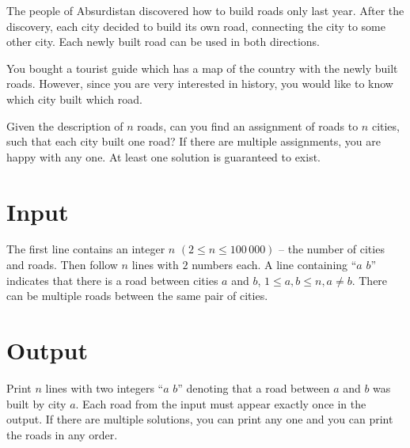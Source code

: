 

\noindent
The people of Absurdistan discovered how to build roads only last year. After the discovery, each
city decided to build its own road, connecting the city to some other city. Each newly built road
can be used in both directions.

You bought a tourist guide which has a map of the country with the newly built roads. However, since
you are very interested in history, you would like to know which city built which road.

Given the description of $n$ roads, can you find an assignment of roads to $n$ cities, such that
each city built one road? If there are multiple assignments, you are happy with any one. At least
one solution is guaranteed to exist.


\section*{Input}
The first line contains an integer $n$ $(2\le n\le 100\,000)$ -- the number of cities and roads.
Then follow $n$ lines with $2$ numbers each. A line containing ``$a$ $b$'' indicates that there is a
road between cities $a$ and $b$, $1 \le a, b\le n, a \not= b$. There can be multiple roads between
the same pair of cities.

\section*{Output}
Print $n$ lines with two integers ``$a$ $b$'' denoting that a road between $a$ and $b$ was built by
city $a$. Each road from the input must appear exactly once in the output. If there are multiple
solutions, you can print any one and you can print the roads in any order.

